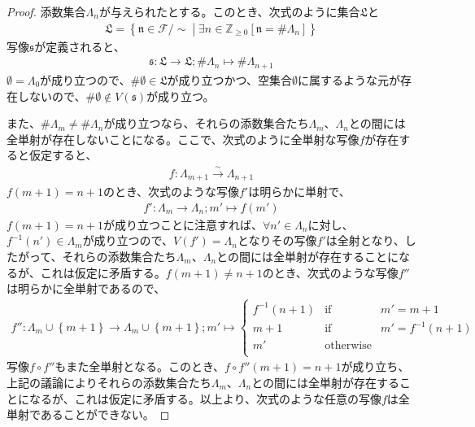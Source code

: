 \documentclass[dvipdfmx]{jsarticle}
\begin{document}
\begin{proof}
添数集合$\varLambda_{n}$が与えられたとする。このとき、次式のように集合$\mathfrak{L}$と
\begin{align*}
\mathfrak{L} =\left\{ \mathfrak{n \in}\mathcal{F} /\sim \middle| \exists n \in \mathbb{Z}_{\geq 0}\left[ \mathfrak{n}=\# \varLambda_{n} \right] \right\}
\end{align*}
写像$\mathfrak{s}$が定義されると、
\begin{align*}
\mathfrak{s:L \rightarrow L};\# \varLambda_{n} \mapsto \# \varLambda_{n + 1}
\end{align*}
$\emptyset  = \varLambda_{0}$が成り立つので、$\# \emptyset \in \mathfrak{L}$が成り立つかつ、空集合$\emptyset $に属するような元が存在しないので、$\# \emptyset  \notin V\left( \mathfrak{s} \right)$が成り立つ。\par
また、$\# \varLambda_{m} \neq \# \varLambda_{n}$が成り立つなら、それらの添数集合たち$\varLambda_{m}$、$\varLambda_{n}$との間には全単射が存在しないことになる。ここで、次式のように全単射な写像$f$が存在すると仮定すると、
\begin{align*}
f:\varLambda_{m + 1}\overset{\sim}{\rightarrow}\varLambda_{n + 1}
\end{align*}
$f(m + 1) = n + 1$のとき、次式のような写像$f'$は明らかに単射で、
\begin{align*}
f':\varLambda_{m} \rightarrow \varLambda_{n};m' \mapsto f\left( m' \right)
\end{align*}
$f(m + 1) = n + 1$が成り立つことに注意すれば、$\forall n' \in \varLambda_{n}$に対し、$f^{- 1}\left( n' \right) \in \varLambda_{m}$が成り立つので、$V\left( f' \right) = \varLambda_{n}$となりその写像$f'$は全射となり、したがって、それらの添数集合たち$\varLambda_{m}$、$\varLambda_{n}$との間には全単射が存在することになるが、これは仮定に矛盾する。$f(m + 1) \neq n + 1$のとき、次式のような写像$f''$は明らかに全単射であるので、
\begin{align*}
f'':\varLambda_{m} \cup \left\{ m + 1 \right\} \rightarrow \varLambda_{m} \cup \left\{ m + 1 \right\};m' \mapsto \left\{ \begin{matrix}
f^{- 1}(n + 1) & {\mathrm{if}} & m' = m + 1 \\
m + 1 & {\mathrm{if}} & m' = f^{- 1}(n + 1) \\
m' & \mathrm{otherwise} & \  \\
\end{matrix} \right.\ 
\end{align*}
写像$f \circ f''$もまた全単射となる。このとき、$f \circ f''(m + 1) = n + 1$が成り立ち、上記の議論によりそれらの添数集合たち$\varLambda_{m}$、$\varLambda_{n}$との間には全単射が存在することになるが、これは仮定に矛盾する。以上より、次式のような任意の写像$f$は全単射であることができない。

\end{proof}
\end{document}
